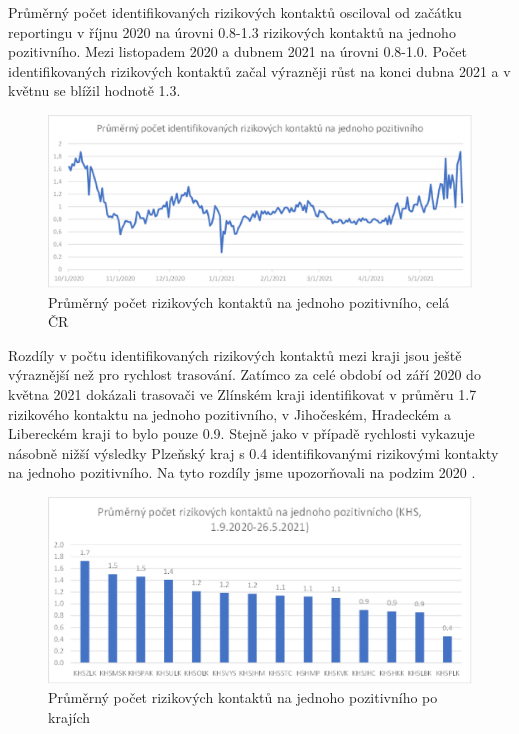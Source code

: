 Průměrný počet identifikovaných rizikových kontaktů osciloval od začátku reportingu v říjnu 2020 na úrovni 0.8-1.3 rizikových kontaktů na jednoho pozitivního. Mezi listopadem 2020 a dubnem 2021 na úrovni 0.8-1.0. Počet identifikovaných rizikových kontaktů začal výrazněji růst na konci dubna 2021 a v květnu se blížil hodnotě 1.3.

\begin{figure}[ht]
    \centering
    \includegraphics[width=1\textwidth]{./pic/e.eps}
    \caption{Průměrný počet rizikových kontaktů na jednoho pozitivního, celá ČR}
    \label{fig:rizik1}
\end{figure}

Rozdíly v počtu identifikovaných rizikových kontaktů mezi kraji jsou ještě výraznější než pro rychlost trasování. Zatímco za celé období od září 2020 do května 2021 dokázali trasovači ve Zlínském kraji identifikovat v průměru 1.7 rizikového kontaktu na jednoho pozitivního, v Jihočeském, Hradeckém a Libereckém kraji to bylo pouze 0.9. Stejně jako v případě rychlosti vykazuje násobně nižší výsledky Plzeňský kraj s 0.4 identifikovanými rizikovými kontakty na jednoho pozitivního. Na tyto rozdíly jsme upozorňovali na podzim 2020 \cite{tr_bisop04}.

\begin{figure}[ht]
    \centering
    \includegraphics[width=1\textwidth]{./pic/f.eps}
    \caption{Průměrný počet rizikových kontaktů na jednoho pozitivního po krajích}
    \label{fig:rizik1kraj}
\end{figure}

